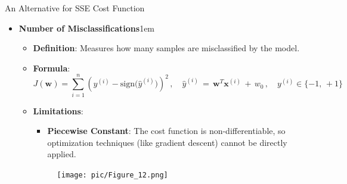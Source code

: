 \documentclass[serif, aspectratio=169]{beamer}
\begin{document}
\begin{frame}{An Alternative for SSE Cost Function}
    \begin{itemize}
        \item \textbf{Number of Misclassifications}\itemsep1em
        \medskip
        \begin{itemize}\itemsep0.8em
            \item \textbf{Definition}:
            Measures how many samples are misclassified by the model.
            \item \textbf{Formula}:
                \[
                J(\mathbf{w}) = \sum_{i=1}^{n} (y^{(i)} - \text{sign(\(\hat{y}^{(i)})\)})^2 \, , \quad \hat{y}^{(i)} \, = \, \mathbf{w}^T\mathbf{x}^{(i)} \, + \, w_0 \, , \quad y^{(i)} \in \{-1, \, +1\}
                \]
            \item \textbf{Limitations}: \\
            \begin{itemize}
                \item \justifying \textbf{Piecewise Constant}:
                The cost function is non-differentiable, so optimization techniques (like gradient descent) cannot be directly applied.
            \end{itemize}
            \endminipage
            \hspace{1cm}
            \begin{figure}[bh]
                \texttt{[image: pic/Figure\_12.png]}
            \end{figure}
            \endminipage
        \end{itemize}
    \end{itemize}
    \vfill
\end{frame}
\end{document}
